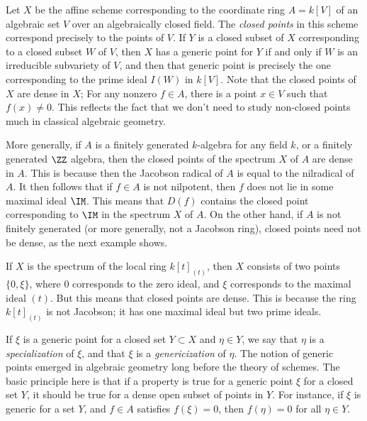 \begin{example}
    Let $X$ be the affine scheme corresponding to the coordinate ring $A = k[V]$ of an algebraic set $V$ over an algebraically closed field. The \emph{closed points} in this scheme correspond precisely to the points of $V$. If $Y$ is a closed subset of $X$ corresponding to a closed subset $W$ of $V$, then $X$ has a generic point for $Y$ if and only if $W$ is an irreducible subvariety of $V$, and then that generic point is precisely the one corresponding to the prime ideal $I(W)$ in $k[V]$. Note that the closed points of $X$ are dense in $X$; For any nonzero $f \in A$, there is a point $x \in V$ such that $f(x) \neq 0$. This reflects the fact that we don't need to study non-closed points much in classical algebraic geometry.
\end{example}

More generally, if $A$ is a finitely generated $k$-algebra for any field $k$, or a finitely generated $\ZZ$ algebra, then the closed points of the spectrum $X$ of $A$ are dense in $A$. This is because then the Jacobson radical of $A$ is equal to the nilradical of $A$. It then follows that if $f \in A$ is not nilpotent, then $f$ does not lie in some maximal ideal $\IM$. This means that $D(f)$ contains the closed point corresponding to $\IM$ in the spectrum $X$ of $A$. On the other hand, if $A$ is not finitely generated (or more generally, not a Jacobson ring), closed points need not be dense, as the next example shows.

\begin{example}
    If $X$ is the spectrum of the local ring $k[t]_{(t)}$, then $X$ consists of two points $\{ 0, \xi \}$, where $0$ corresponds to the zero ideal, and $\xi$ corresponds to the maximal ideal $(t)$. But this means that closed points are dense. This is because the ring $k[t]_{(t)}$ is not Jacobson; it has one maximal ideal but two prime ideals.
\end{example}

If $\xi$ is a generic point for a closed set $Y \subset X$ and $\eta \in Y$, we say that $\eta$ is a \emph{specialization} of $\xi$, and that $\xi$ is a \emph{genericization} of $\eta$. The notion of generic points emerged in algebraic geometry long before the theory of schemes. The basic principle here is that if a property is true for a generic point $\xi$ for a closed set $Y$, it should be true for a dense open subset of points in $Y$. For instance, if $\xi$ is generic for a set $Y$, and $f \in A$ satisfies $f(\xi) = 0$, then $f(\eta) = 0$ for all $\eta \in Y$.

